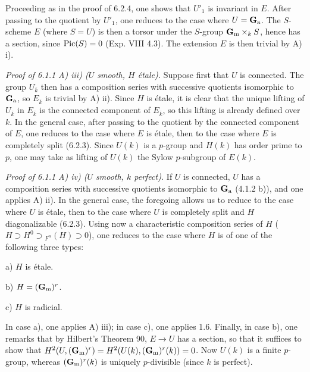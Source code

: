 Proceeding as in the proof of 6.2.4, one shows that $U'_1$ is invariant in $E$. After passing to the quotient by $U'_1$, one reduces to the case where $U=\mathbf{G}_{\mathrm{a}}$. The $S$-scheme $E$ (where $S=U$) is then a torsor under the $S$-group $\mathbf{G}_{\mathrm{m}}\times_k S$, hence has a section, since $\operatorname{Pic}(S)=0$ (Exp. VIII 4.3). The extension $E$ is then trivial by A) i).

\par\noindent\emph{Proof of 6.1.1 A) iii) ($U$ smooth, $H$ étale).}
Suppose first that $U$ is connected. The group $U_{\bar k}$ then has a composition series with successive quotients isomorphic to $\mathbf{G}_{\mathrm{a}}$, so $E_{\bar k}$ is trivial by A) ii). Since $H$ is étale, it is clear that the unique lifting of $U_{\bar k}$ in $E_{\bar k}$ is the connected component of $E_{\bar k}$, so this lifting is already defined over $k$. In the general case, after passing to the quotient by the connected component of $E$, one reduces to the case where $E$ is étale, then to the case where $E$ is completely split (6.2.3). Since $U(k)$ is a $p$-group and $H(k)$ has order prime to $p$, one may take as lifting of $U(k)$ the Sylow $p$-subgroup of $E(k)$.

\par\noindent\emph{Proof of 6.1.1 A) iv) ($U$ smooth, $k$ perfect).}
If $U$ is connected, $U$ has a composition series with successive quotients isomorphic to $\mathbf{G}_{\mathrm{a}}$ (4.1.2 b)), and one applies A) ii). In the general case, the foregoing allows us to reduce to the case where $U$ is étale, then to the case where $U$ is completely split and $H$ diagonalizable (6.2.3). Using now a characteristic composition series of $H$ ($H\supset H^0\supset {}_{F^n}(H)\supset0$), one reduces to the case where $H$ is of one of the following three types:

\noindent a) $H$ is étale.

\noindent b) $H=(\mathbf{G}_{\mathrm{m}})^r$.

\noindent c) $H$ is radicial.

In case a), one applies A) iii); in case c), one applies 1.6. Finally, in case b), one remarks that by Hilbert's Theorem 90, $E\to U$ has a section, so that it suffices to show that $H^2(U,(\mathbf{G}_{\mathrm{m}})^r)=H^2(U(k),(\mathbf{G}_{\mathrm{m}})^r(k))=0$. Now $U(k)$ is a finite $p$-group, whereas $(\mathbf{G}_{\mathrm{m}})^r(k)$ is uniquely $p$-divisible (since $k$ is perfect).

